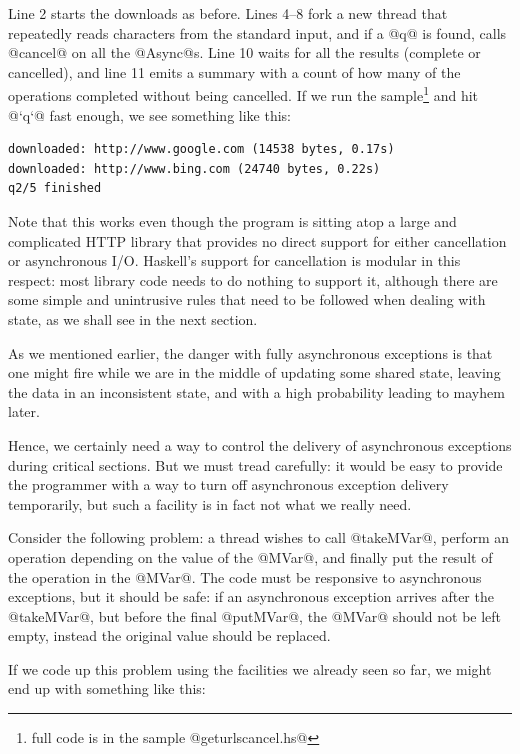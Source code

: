 \noindent Line 2 starts the downloads as before.  Lines 4--8 fork a
new thread that repeatedly reads characters from the standard input,
and if a @q@ is found, calls @cancel@ on all the @Async@s.  Line 10
waits for all the results (complete or cancelled), and line 11 emits a
summary with a count of how many of the operations completed without
being cancelled.  If we run the sample\footnote{full code is in the
  sample @geturlscancel.hs@} and hit @`q`@ fast enough, we see
something like this:

\begin{verbatim}
downloaded: http://www.google.com (14538 bytes, 0.17s)
downloaded: http://www.bing.com (24740 bytes, 0.22s)
q2/5 finished
\end{verbatim}

Note that this works even though the program is sitting atop a large
and complicated HTTP library that provides no direct support for
either cancellation or asynchronous I/O.  Haskell's support for
cancellation is modular in this respect: most library code needs to do
nothing to support it, although there are some simple and unintrusive
rules that need to be followed when dealing with state, as we shall
see in the next section.


As we mentioned earlier, the danger with fully asynchronous exceptions
is that one might fire while we are in the middle of updating some
shared state, leaving the data in an inconsistent state, and with a
high probability leading to mayhem later.

Hence, we certainly need a way to control the delivery of asynchronous
exceptions during critical sections.  But we must tread carefully: it
would be easy to provide the programmer with a way to turn off
asynchronous exception delivery temporarily, but such a facility is in
fact not what we really need.

Consider the following problem: a thread wishes to call @takeMVar@,
perform an operation depending on the value of the @MVar@, and finally
put the result of the operation in the @MVar@.  The code must be
responsive to asynchronous exceptions, but it should be safe: if an
asynchronous exception arrives after the @takeMVar@, but before the
final @putMVar@, the @MVar@ should not be left empty, instead the
original value should be replaced.

If we code up this problem using the facilities we already seen so
far, we might end up with something like this:

